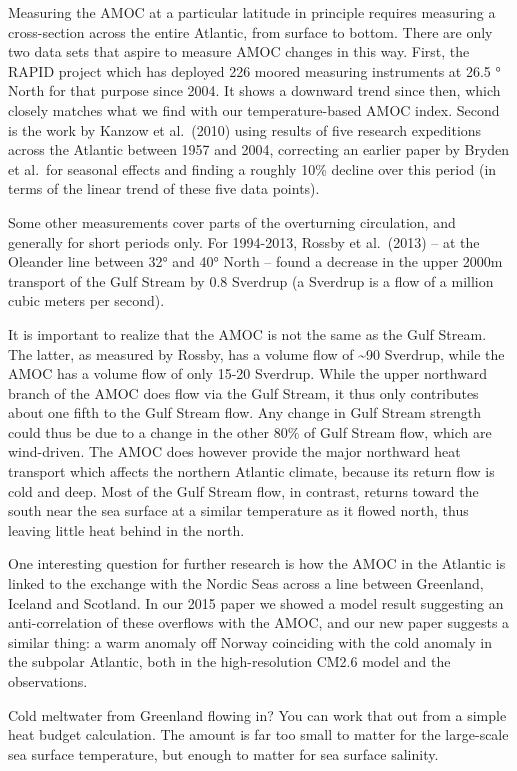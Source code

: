 \documentclass[
]{book}
\begin{document}
Measuring the AMOC at a particular latitude in principle requires measuring a cross-section across the entire Atlantic, from surface to bottom. There are only two data sets that aspire to measure AMOC changes in this way. First, the RAPID project which has deployed 226 moored measuring instruments at 26.5 ° North for that purpose since 2004. It shows a downward trend since then, which closely matches what we find with our temperature-based AMOC index. Second is the work by Kanzow et al.~(2010) using results of five research expeditions across the Atlantic between 1957 and 2004, correcting an earlier paper by Bryden et al.~for seasonal effects and finding a roughly 10\% decline over this period (in terms of the linear trend of these five data points).

Some other measurements cover parts of the overturning circulation, and generally for short periods only. For 1994-2013, Rossby et al.~(2013) -- at the Oleander line between 32° and 40° North -- found a decrease in the upper 2000m transport of the Gulf Stream by 0.8 Sverdrup (a Sverdrup is a flow of a million cubic meters per second).

It is important to realize that the AMOC is not the same as the Gulf Stream. The latter, as measured by Rossby, has a volume flow of \textasciitilde90 Sverdrup, while the AMOC has a volume flow of only 15-20 Sverdrup. While the upper northward branch of the AMOC does flow via the Gulf Stream, it thus only contributes about one fifth to the Gulf Stream flow. Any change in Gulf Stream strength could thus be due to a change in the other 80\% of Gulf Stream flow, which are wind-driven. The AMOC does however provide the major northward heat transport which affects the northern Atlantic climate, because its return flow is cold and deep. Most of the Gulf Stream flow, in contrast, returns toward the south near the sea surface at a similar temperature as it flowed north, thus leaving little heat behind in the north.

One interesting question for further research is how the AMOC in the Atlantic is linked to the exchange with the Nordic Seas across a line between Greenland, Iceland and Scotland. In our 2015 paper we showed a model result suggesting an anti-correlation of these overflows with the AMOC, and our new paper suggests a similar thing: a warm anomaly off Norway coinciding with the cold anomaly in the subpolar Atlantic, both in the high-resolution CM2.6 model and the observations.

Cold meltwater from Greenland flowing in? You can work that out from a simple heat budget calculation. The amount is far too small to matter for the large-scale sea surface temperature, but enough to matter for sea surface salinity.
\end{document}
